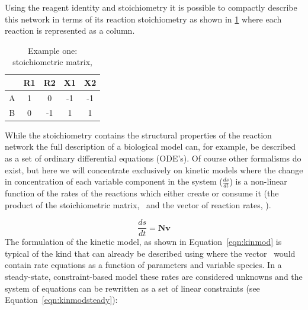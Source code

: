 %
%
Using the reagent identity and stoichiometry it is possible to compactly
describe this network in terms of its reaction stoichiometry as shown in
\ref{tble:ex1nmat} where each reaction is represented as a column. 

\begin{table}[h]
  \centering
    \begin{tabular}{c|cccc}
          & R1 & R2 & X1 & X2 \\ \hline
        A & 1 &  0 & -1 & -1 \\
        B & 0 & -1 &  1 &  1 \\
    \end{tabular}
  \caption{Example one: stoichiometric matrix, \Nmat}
  \label{tble:ex1nmat}
\end{table}
%
While the stoichiometry contains the structural properties of the
reaction network the full description of a biological model can, for example, be described as a set of ordinary differential equations (ODE's). Of course other formalisms do exist, but here we will concentrate exclusively on kinetic models where the change in concentration of each variable component in the system ($\frac{ds}{dt}$) is a non-linear function of the rates of the reactions which either create or consume it (the product of the stoichiometric matrix, \Nmat\ and the vector of reaction rates, \vvec).

%
\begin{equation}\label{eqn:kinmod}
  \frac{ds}{dt} = \textbf{Nv}
\end{equation}
%
The formulation of the kinetic model, as shown in
Equation~\ref{eqn:kinmod} is typical of the kind that can already be
described using \sbmlthreecore where the vector \vvec\ would contain
rate equations as a function of parameters and variable species. In a
steady-state, constraint-based model these rates are considered unknowns
and the system of equations can be rewritten as a set of linear
constraints (see Equation~\ref{eqn:kinmodsteady}):


